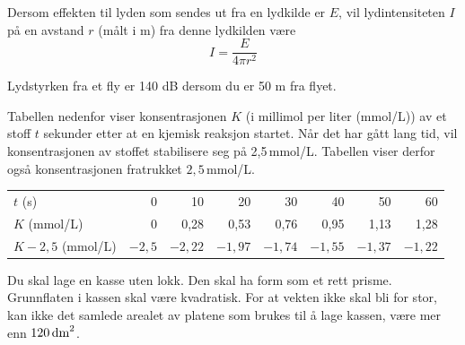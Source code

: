 
Dersom effekten til lyden som sendes ut fra en lydkilde er $E$, vil
lydintensiteten $I$ på en avstand $r$ (målt i m) fra denne lydkilden være
%
\[
I = \frac{E}{4\pi r^2}
\]

Lydstyrken fra et fly er 140 dB dersom du er 50 m fra flyet.


\newpage
{}
Tabellen nedenfor viser konsentrasjonen $K$ (i millimol per liter (mmol/L)) av et
stoff $t$ sekunder etter at en kjemisk reaksjon startet. 
Når det har gått lang tid, vil konsentrasjonen av stoffet stabilisere seg på 2,5\,mmol/L. Tabellen viser derfor også konsentrasjonen fratrukket $2,5$\,mmol/L.

\begin{center}
	\small
	\begin{tabular}{l r r r r r r r}
		\hline
		$t$ (s) & 0 & 10 & 20 & 30 & 40 & 50 & 60 \\
		$K$ (mmol/L)& 0 & 0{,}28 & 0{,}53 & 0{,}76 & 0{,}95 & 1{,}13 & 1{,}28 \\
		$K-2{,}5$ (mmol/L) & $-2{,}5$ & $-2{,}22$ & $-1{,}97$ & $-1{,}74$ & $-1{,}55$ & $-1{,}37$ & $-1{,}22$ \\
		\hline
	\end{tabular}
\end{center}


Du skal lage en kasse uten lokk. Den skal ha form som et rett prisme.
Grunnflaten i kassen skal være kvadratisk. For at vekten ikke skal bli for stor,
kan ikke det samlede arealet av platene som brukes til å lage kassen, være mer
enn $120\,\text{dm}^2$.

